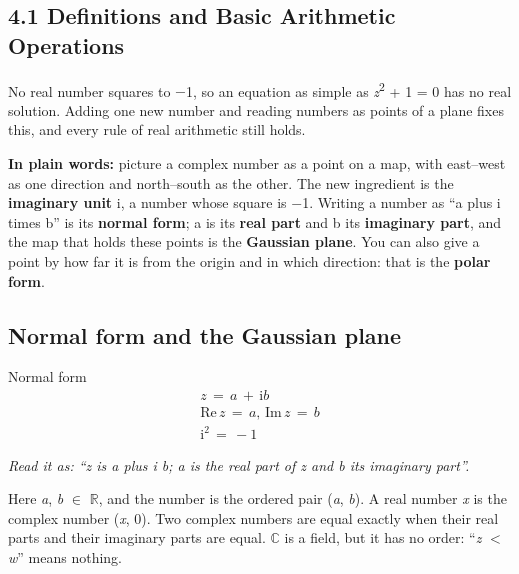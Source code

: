 \documentclass[11pt]{article}
\begin{document}
\begin{keepsection}
\section{4.1 Definitions and Basic Arithmetic Operations}

No real number squares to \ensuremath{-}1, so an equation as simple as \textit{z}\textsuperscript{2} + 1 = 0 has no real solution. Adding one new number and reading numbers as points of a plane fixes this, and every rule of real arithmetic still holds.

\begin{plainbox}\textbf{In plain words:} picture a complex number as a point on a map, with east–west as one direction and north–south as the other. The new ingredient is the \textbf{imaginary unit} i, a number whose square is \ensuremath{-}1. Writing a number as “a plus i times b” is its \textbf{normal form}; a is its \textbf{real part} and b its \textbf{imaginary part}, and the map that holds these points is the \textbf{Gaussian plane}. You can also give a point by how far it is from the origin and in which direction: that is the \textbf{polar form}.\end{plainbox}

\begin{keepsection}
\subsection{Normal form and the Gaussian plane}

\begin{equationcard}{Normal form}
\[ \begin{gathered} {z}\, =\, {a}\, +\, \mathrm{i}{b} \\ \text{Re}\, {z}\, =\, {a},\, \text{Im}\, {z}\, =\, {b} \\ \mathrm{i}^{2}\, =\, -1 \end{gathered} \]
{\small \emph{Read it as: “z is a plus i b; a is the real part of z and b its imaginary part”.}\par Here \textit{a}, \textit{b} \ensuremath{\in} \ensuremath{\mathbb{R}}, and the number is the ordered pair (\textit{a}, \textit{b}). A real number \textit{x} is the complex number (\textit{x}, 0). Two complex numbers are equal exactly when their real parts and their imaginary parts are equal. \ensuremath{\mathbb{C}} is a field, but it has no order: “\textit{z} \ensuremath{<} \textit{w}” means nothing.}
\end{equationcard}


\end{keepsection}
\end{keepsection}
\end{document}
